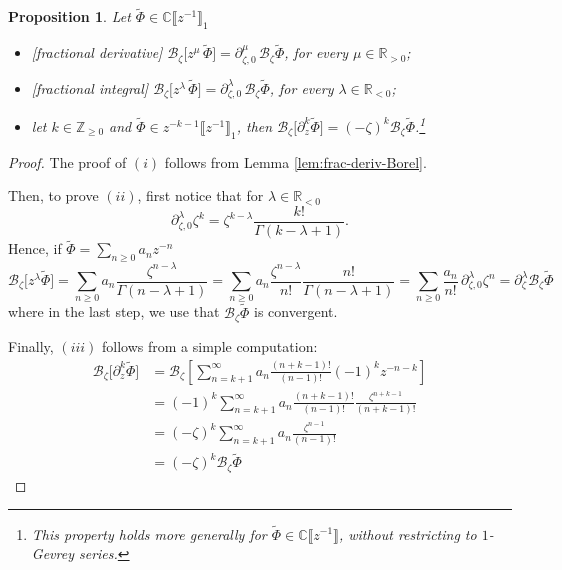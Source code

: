 \documentclass{article}
\newcommand{\Z}{\mathbb{Z}}
\newcommand{\R}{\mathbb{R}}
\newcommand{\C}{\mathbb{C}}
\newcommand{\series}[1]{\tilde{#1}}
\newcommand{\fracderiv}[3]{\partial^{#1}_{#2, #3}}
\newcommand*{\defeq}{\mathrel{\vcenter{\baselineskip0.5ex \lineskiplimit0pt
                     \hbox{\scriptsize.}\hbox{\scriptsize.}}}%
                     =}
\newcommand{\borel}{\mathcal{B}}
\theoremstyle{definition}
\theoremstyle{plain}
\newtheorem{prop}[definition]{Proposition}
\begin{document}
\begin{prop}\label{prop:frac-der-int-borel}
Let $\tilde{\Phi}\in\C\llbracket z^{-1}\rrbracket_1$ %
\begin{itemize}
\item[(i)] \emph{[fractional derivative]} $\borel_\zeta\big[ z^\mu \, \tilde{\Phi}\big]=\fracderiv{\mu}{\zeta}{0}\, \borel_\zeta\series{\Phi}$, for every $\mu\in\R_{> 0}$;
\item[(ii)] \emph{[fractional integral]} $\borel_\zeta\big[z^\lambda\, \tilde{\Phi}\big]=\fracderiv{\lambda}{\zeta}{0}\,\borel_\zeta\series{\Phi}$, for every $\lambda\in\R_{<0}$; 
\item[(iii)] let $k\in\Z_{\ge 0}$ and $\tilde{\Phi}\in z^{-k-1}\llbracket z^{-1}\rrbracket_1$, then $\borel_\zeta\big[\partial_z^{k} \tilde{\Phi}\big]=(-\zeta)^k\borel_\zeta\tilde{\Phi}$.\footnote{This property holds more generally for $\tilde{\Phi}\in\C\llbracket z^{-1}\rrbracket$, without restricting to $1$-Gevrey series.}
\end{itemize} 
\end{prop}
\begin{proof} 
The proof of $(i)$ follows from Lemma \ref{lem:frac-deriv-Borel}. 

Then, to prove $(ii)$, first notice that for $\lambda\in\R_{< 0}$  
\[\fracderiv{\lambda}{\zeta}{0}\zeta^{k}=\zeta^{k-\lambda}\frac{k!}{\Gamma(k-\lambda+1)}.\] 
Hence, if $\tilde{\Phi}=\sum_{n\geq 0}a_n z^{-n}$ %
\[\borel_\zeta \big[z^\lambda \tilde{\Phi}\big]=\sum_{n\geq 0}a_n\frac{\zeta^{n-\lambda}}{\Gamma(n-\lambda+1)}=\sum_{n\geq 0}a_n\frac{\zeta^{n-\lambda}}{n!}\frac{n!}{\Gamma(n-\lambda+1)}=\sum_{n\geq 0} \frac{a_n}{n!}\,\fracderiv{\lambda}{\zeta}{0}\zeta^n=\partial_\zeta^\lambda\borel_\zeta\series{\Phi}\]
where in the last step, we use that $\borel_\zeta\tilde{\Phi}$ is convergent. 

Finally, $(iii)$ follows from a simple computation: 
\begin{align*}
\borel_\zeta\big[\partial_z^k\tilde{\Phi}\big]&=\borel_\zeta\left[\sum_{n=k+1}^\infty a_n \frac{(n+k-1)!}{(n-1)!} (-1)^{k} z^{-n-k}\right]\\
&=(-1)^k \sum_{n=k+1}^\infty a_n \frac{(n+k-1)!}{(n-1)!}\frac{\zeta^{n+k-1}}{(n+k-1)!}\\
&=(-\zeta)^k\sum_{n=k+1}^\infty a_n \frac{\zeta^{n-1}}{(n-1)!}\\
&=(-\zeta)^k\borel_\zeta \tilde{\Phi}
\end{align*}
\end{proof}
\end{document}
